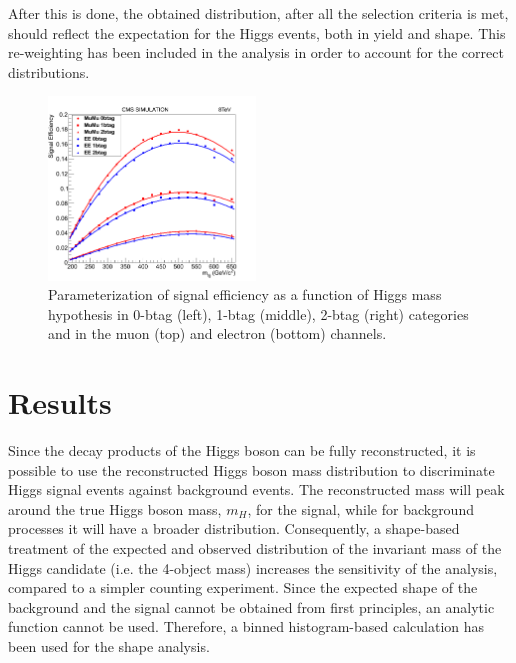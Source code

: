 After this is done, the obtained distribution, after all the selection criteria is met, should reflect the expectation for the Higgs events, both in yield and shape. This re-weighting has been included in the analysis in order to account for the correct distributions.

\begin{figure}[htbp]
\begin{center}
\includegraphics[width=0.49\textwidth]{plots/all_signal_effs.png}
\caption{
Parameterization of signal efficiency as a function of Higgs mass hypothesis in
0-btag (left), 1-btag (middle), 2-btag (right) categories and in the
muon (top) and electron (bottom) channels.
}
\label{fig:effvsmass}
\end{center}
\end{figure}


\section{Results}

Since the decay products of the Higgs boson can be fully reconstructed, it is possible to use the reconstructed Higgs boson mass distribution to discriminate Higgs signal events against background events. The reconstructed mass will peak around the true Higgs boson mass, $m_{H}$, for the signal, while for background processes it will have a broader distribution.  Consequently, a shape-based treatment of the expected and observed distribution of the invariant mass of the Higgs candidate (i.e. the 4-object mass) increases the sensitivity of the analysis, compared to a simpler counting experiment. Since the expected shape of the background and the signal cannot be obtained from first principles, an analytic function cannot be used. Therefore, a binned histogram-based calculation has been used for the shape analysis.

